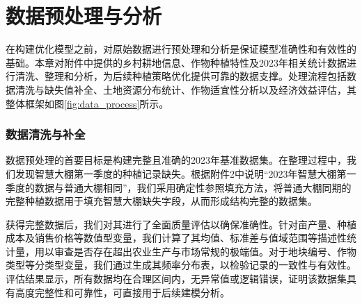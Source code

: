 \section{数据预处理与分析}


在构建优化模型之前，对原始数据进行预处理和分析是保证模型准确性和有效性的基础。本章对附件中提供的乡村耕地信息、作物种植特性及2023年相关统计数据进行清洗、整理和分析，为后续种植策略优化提供可靠的数据支撑。处理流程包括数据清洗与缺失值补全、土地资源分布统计、作物适宜性分析以及经济效益评估，其整体框架如图\ref{fig:data_process}所示。



\subsubsection{数据清洗与补全}

数据预处理的首要目标是构建完整且准确的2023年基准数据集。在整理过程中，我们发现智慧大棚第一季度的种植记录缺失。根据附件2中说明“2023年智慧大棚第一季度的数据与普通大棚相同”，我们采用确定性参照填充方法，将普通大棚同期的完整种植数据用于填充智慧大棚缺失字段，从而形成结构完整的数据集。

获得完整数据后，我们对其进行了全面质量评估以确保准确性。针对亩产量、种植成本及销售价格等数值型变量，我们计算了其均值、标准差与值域范围等描述性统计量，用以审查是否存在超出农业生产与市场常规的极端值。对于地块编号、作物类型等分类型变量，我们通过生成其频率分布表，以检验记录的一致性与有效性。评估结果显示，所有数据均在合理区间内，无异常值或逻辑错误，证明该数据集具有高度完整性和可靠性，可直接用于后续建模分析。


